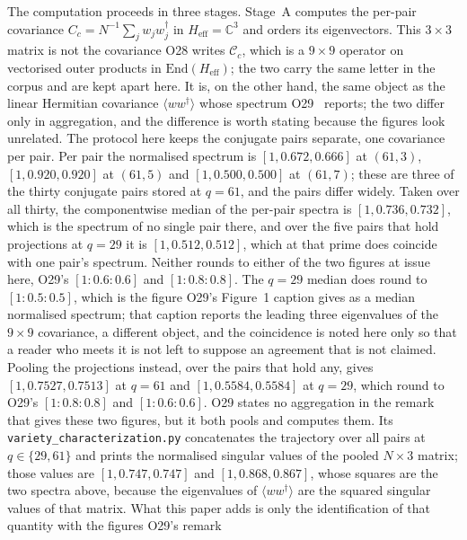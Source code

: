 \documentclass[11pt,a4paper]{article}
\newcommand{\Heff}{H_{\mathrm{eff}}}
\begin{document}
    The computation proceeds in three stages.
    Stage~A computes the per-pair covariance $C_c = N^{-1}\sum_j w_j w_j^\dagger$
    in $H_{\mathrm{eff}} = \mathbb{C}^3$ and orders its eigenvectors.
    This $3 \times 3$ matrix is not the covariance O28 writes $\mathcal{C}_c$, which is a
    $9 \times 9$ operator on vectorised outer products in $\mathrm{End}(\Heff)$; the two carry the
    same letter in the corpus and are kept apart here.
    It is, on the other hand, the same object as the linear Hermitian covariance
    $\langle w w^\dagger \rangle$ whose spectrum O29~\cite{Beau2026a33} reports; the two differ only
    in aggregation, and the difference is worth stating because the figures look unrelated.
    The protocol here keeps the conjugate pairs separate, one covariance per pair.
    Per pair the normalised spectrum is $[1, 0.672, 0.666]$ at $(61,3)$, $[1, 0.920, 0.920]$ at
    $(61,5)$ and $[1, 0.500, 0.500]$ at $(61,7)$; these are three of the thirty conjugate pairs
    stored at $q = 61$, and the pairs differ widely.
    Taken over all thirty, the componentwise median of the per-pair spectra is $[1, 0.736, 0.732]$,
    which is the spectrum of no single pair there, and over the five pairs that hold projections at
    $q = 29$ it is $[1, 0.512, 0.512]$, which at that prime does coincide with one pair's spectrum.
    Neither rounds to either of the two figures at issue here, O29's $[1:0.6:0.6]$ and
    $[1:0.8:0.8]$.
    The $q = 29$ median does round to $[1:0.5:0.5]$, which is the figure O29's Figure~1 caption
    gives as a median normalised spectrum; that caption reports the leading three eigenvalues of the
    $9 \times 9$ covariance, a different object, and the coincidence is noted here only so that a
    reader who meets it is not left to suppose an agreement that is not claimed.
    Pooling the projections instead, over the pairs that hold any, gives $[1, 0.7527, 0.7513]$ at
    $q = 61$ and $[1, 0.5584, 0.5584]$ at $q = 29$, which round to O29's $[1:0.8:0.8]$ and
    $[1:0.6:0.6]$.
    O29 states no aggregation in the remark that gives these two figures, but it both pools and
    computes them.
    Its \texttt{variety\_characterization.py} concatenates the trajectory over all pairs at
    $q \in \{29, 61\}$ and prints the normalised singular values of the pooled $N \times 3$ matrix;
    those values are $[1, 0.747, 0.747]$ and $[1, 0.868, 0.867]$, whose squares are the two spectra
    above, because the eigenvalues of $\langle w w^\dagger \rangle$ are the squared singular values
    of that matrix.
    What this paper adds is only the identification of that quantity with the figures O29's remark
\end{document}
